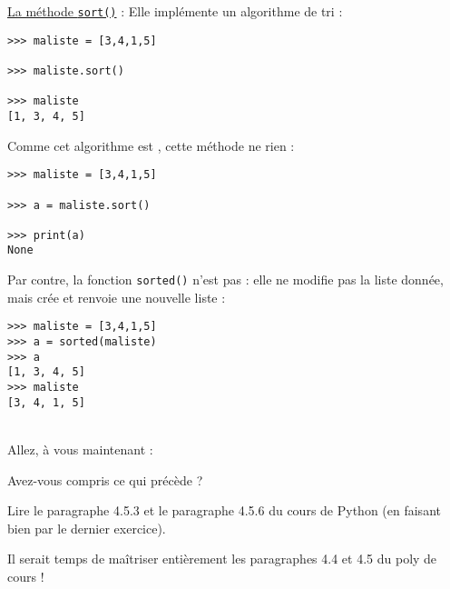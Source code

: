 \begin{enonce}
\nipuce  \ul{La méthode \texttt{sort()}} : Elle implémente un algorithme de tri  :
\begin{verbatim}
>>> maliste = [3,4,1,5]

>>> maliste.sort()

>>> maliste
[1, 3, 4, 5]
\end{verbatim}

Comme cet algorithme est , cette méthode ne  rien :
\begin{verbatim}
>>> maliste = [3,4,1,5]

>>> a = maliste.sort()

>>> print(a)
None
\end{verbatim}






\nipuce  Par contre, la fonction \texttt{sorted()} n'est pas  : elle ne modifie pas la liste donnée, mais crée et renvoie une nouvelle liste :
\begin{verbatim}
>>> maliste = [3,4,1,5]
>>> a = sorted(maliste)
>>> a
[1, 3, 4, 5]
>>> maliste
[3, 4, 1, 5]
\end{verbatim}


\\

Allez, à vous maintenant :

\ques Avez-vous compris ce qui précède ?

\ques  Lire le paragraphe 4.5.3  et le paragraphe 4.5.6 du cours de Python (en faisant bien par le dernier exercice).




\end{enonce}

\begin{correction}

\end{correction}


\exo

\begin{enonce}

Il serait temps de maîtriser entièrement les paragraphes 4.4 et 4.5 du poly de cours ! 


\end{enonce}


\begin{correction}

\end{correction}
